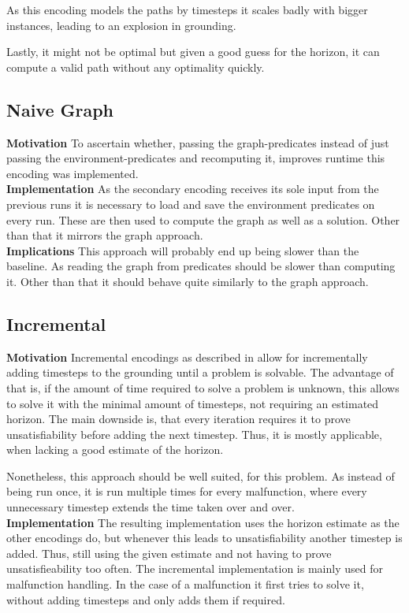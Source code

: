 As this encoding models the paths by timesteps it scales badly with bigger instances, leading to an explosion in grounding.

Lastly, it might not be optimal but given a good guess for the horizon, it can compute a valid path without any optimality quickly.

\subsection{Naive Graph}
\noindent \textbf{Motivation} To ascertain whether, passing the graph-predicates instead of just passing the environment-predicates and recomputing it, improves runtime this encoding was implemented.\\

\noindent \textbf{Implementation} As the secondary encoding receives its sole input from the previous runs it is necessary to load and save the environment predicates on every run. These are then used to compute the graph as well as a solution. Other than that it mirrors the graph approach.\\

\noindent \textbf{Implications} This approach will probably end up being slower than the baseline. As reading the graph from predicates should be slower than computing it. Other than that it should behave quite similarly to the graph approach.

\subsection{Incremental}
\textbf{Motivation} Incremental encodings as described in \cite{incr} allow for incrementally adding timesteps to the grounding until a problem is solvable. The advantage of that is, if the amount of time required to solve a problem is unknown, this allows to solve it with the minimal amount of timesteps, not requiring an estimated horizon. The main downside is, that every iteration requires it to prove unsatisfiability before adding the next timestep. Thus, it is mostly applicable, when lacking a good estimate of the horizon.

Nonetheless, this approach should be well suited, for this problem. As instead of being run once, it is run multiple times for every malfunction, where every unnecessary timestep extends the time taken over and over. \\

\noindent \textbf{Implementation} The resulting implementation uses the horizon estimate as the other encodings do, but whenever this leads to unsatisfiability another timestep is added. Thus, still using the given estimate and not having to prove unsatisfieability too often. The incremental implementation is mainly used for malfunction handling. In the case of a malfunction it first tries to solve it, without adding timesteps and only adds them if required. 


